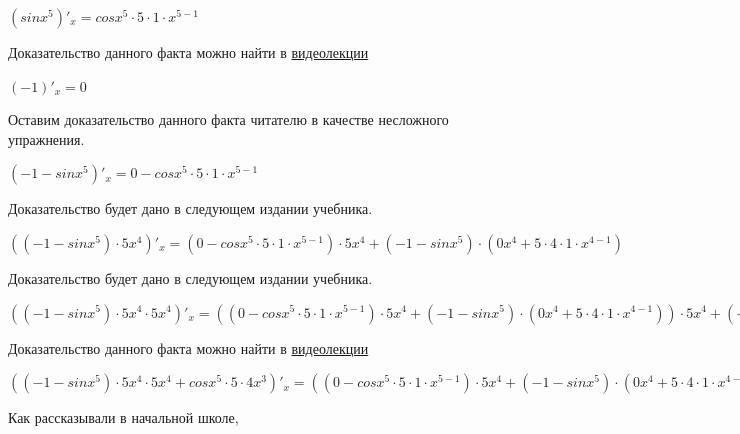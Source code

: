 \documentclass[12pt,a4paper,fleqn]{article}
\theoremstyle{definition}
\begin{document}
$(sin{ x }^{ 5 })'_{x} = cos{ x }^{ 5 } \cdot  5  \cdot  1  \cdot { x }^{ 5  -  1 }$

Доказательство данного факта можно найти в \href{https://www.youtube.com/watch?v=dQw4w9WgXcQ}{видеолекции} 

$( -1 )'_{x} =  0 $

Оставим доказательство данного факта читателю в качестве несложного упражнения. 

$( -1  - sin{ x }^{ 5 })'_{x} =  0  - cos{ x }^{ 5 } \cdot  5  \cdot  1  \cdot { x }^{ 5  -  1 }$

Доказательство будет дано в следующем издании учебника. 

$(( -1  - sin{ x }^{ 5 }) \cdot  5 { x }^{ 4 })'_{x} = ( 0  - cos{ x }^{ 5 } \cdot  5  \cdot  1  \cdot { x }^{ 5  -  1 }) \cdot  5 { x }^{ 4 } + ( -1  - sin{ x }^{ 5 }) \cdot ( 0 { x }^{ 4 } +  5  \cdot  4  \cdot  1  \cdot { x }^{ 4  -  1 })$

Доказательство будет дано в следующем издании учебника. 

$(( -1  - sin{ x }^{ 5 }) \cdot  5 { x }^{ 4 } \cdot  5 { x }^{ 4 })'_{x} = (( 0  - cos{ x }^{ 5 } \cdot  5  \cdot  1  \cdot { x }^{ 5  -  1 }) \cdot  5 { x }^{ 4 } + ( -1  - sin{ x }^{ 5 }) \cdot ( 0 { x }^{ 4 } +  5  \cdot  4  \cdot  1  \cdot { x }^{ 4  -  1 })) \cdot  5 { x }^{ 4 } + ( -1  - sin{ x }^{ 5 }) \cdot  5 { x }^{ 4 } \cdot ( 0 { x }^{ 4 } +  5  \cdot  4  \cdot  1  \cdot { x }^{ 4  -  1 })$

Доказательство данного факта можно найти в \href{https://www.youtube.com/watch?v=dQw4w9WgXcQ}{видеолекции} 

$(( -1  - sin{ x }^{ 5 }) \cdot  5 { x }^{ 4 } \cdot  5 { x }^{ 4 } + cos{ x }^{ 5 } \cdot  5  \cdot  4 { x }^{ 3 })'_{x} = (( 0  - cos{ x }^{ 5 } \cdot  5  \cdot  1  \cdot { x }^{ 5  -  1 }) \cdot  5 { x }^{ 4 } + ( -1  - sin{ x }^{ 5 }) \cdot ( 0 { x }^{ 4 } +  5  \cdot  4  \cdot  1  \cdot { x }^{ 4  -  1 })) \cdot  5 { x }^{ 4 } + ( -1  - sin{ x }^{ 5 }) \cdot  5 { x }^{ 4 } \cdot ( 0 { x }^{ 4 } +  5  \cdot  4  \cdot  1  \cdot { x }^{ 4  -  1 }) + ( -1  - sin{ x }^{ 5 }) \cdot  5  \cdot  1  \cdot { x }^{ 5  -  1 } \cdot  5  \cdot  4 { x }^{ 3 } + cos{ x }^{ 5 } \cdot ( 0  \cdot  4 { x }^{ 3 } +  5  \cdot ( 0 { x }^{ 3 } +  4  \cdot  3  \cdot  1  \cdot { x }^{ 3  -  1 }))$

Как рассказывали в начальной школе, 
\end{document}
